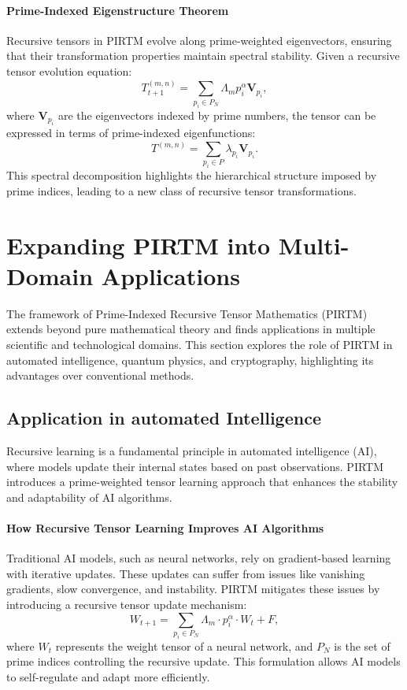 \documentclass{article}
\theoremstyle{plain}
\begin{document}
\paragraph{Prime-Indexed Eigenstructure Theorem}
Recursive tensors in PIRTM evolve along prime-weighted eigenvectors, ensuring that their transformation properties maintain spectral stability. Given a recursive tensor evolution equation:
\begin{equation}
    T_{t+1}^{(m,n)} = \sum_{p_i \in P_N} \Lambda_m p_i^\alpha \mathbf{V}_{p_i},
\end{equation}
where \( \mathbf{V}_{p_i} \) are the eigenvectors indexed by prime numbers, the tensor can be expressed in terms of prime-indexed eigenfunctions:
\begin{equation}
    T^{(m,n)} = \sum_{p_i \in P} \lambda_{p_i} \mathbf{V}_{p_i}.
\end{equation}
This spectral decomposition highlights the hierarchical structure imposed by prime indices, leading to a new class of recursive tensor transformations.
\section{Expanding PIRTM into Multi-Domain Applications}

The framework of Prime-Indexed Recursive Tensor Mathematics (PIRTM) extends beyond pure mathematical theory and finds applications in multiple scientific and technological domains. This section explores the role of PIRTM in automated intelligence, quantum physics, and cryptography, highlighting its advantages over conventional methods.

\subsection{Application in automated Intelligence}

Recursive learning is a fundamental principle in automated intelligence (AI), where models update their internal states based on past observations. PIRTM introduces a prime-weighted tensor learning approach that enhances the stability and adaptability of AI algorithms.

\paragraph{How Recursive Tensor Learning Improves AI Algorithms}
Traditional AI models, such as neural networks, rely on gradient-based learning with iterative updates. These updates can suffer from issues like vanishing gradients, slow convergence, and instability. PIRTM mitigates these issues by introducing a recursive tensor update mechanism:
\begin{equation}
    W_{t+1} = \sum_{p_i \in P_N} \Lambda_m \cdot p_i^\alpha \cdot W_t + F,
\end{equation}
where \( W_t \) represents the weight tensor of a neural network, and \( P_N \) is the set of prime indices controlling the recursive update. This formulation allows AI models to self-regulate and adapt more efficiently.
\end{document}
